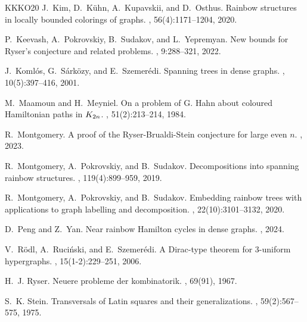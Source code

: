 \documentclass[11pt,reqno]{amsart}
\theoremstyle{definition}
\theoremstyle{remark}
\begin{document}
\begin{thebibliography}{KKKO20}
J.~Kim, D.~K{\"u}hn, A.~Kupavskii, and D.~Osthus.
\newblock Rainbow structures in locally bounded colorings of graphs.
, 56(4):1171--1204, 2020.

P.~Keevash, A.~Pokrovskiy, B.~Sudakov, and L.~Yepremyan.
\newblock New bounds for {R}yser's conjecture and related problems.
, 9:288--321, 2022.

J.~Koml\'{o}s, G.~S\'{a}rk\"{o}zy, and E.~Szemer\'{e}di.
\newblock Spanning trees in dense graphs.
, 10(5):397--416, 2001.

M.~Maamoun and H.~Meyniel.
\newblock On a problem of {G}. {H}ahn about coloured {H}amiltonian paths in {$K\sb{2n}$}.
, 51(2):213--214, 1984.

R.~Montgomery.
\newblock A proof of the {R}yser-{B}rualdi-{S}tein conjecture for large even $ n$.
, 2023.

R.~Montgomery, A.~Pokrovskiy, and B.~Sudakov.
\newblock Decompositions into spanning rainbow structures.
, 119(4):899--959, 2019.

R.~Montgomery, A.~Pokrovskiy, and B.~Sudakov.
\newblock Embedding rainbow trees with applications to graph labelling and decomposition.
, 22(10):3101--3132, 2020.

D.~Peng and Z.~Yan.
\newblock Near rainbow {H}amilton cycles in dense graphs.
, 2024.

V.~R\"{o}dl, A.~Ruci\'{n}ski, and E.~Szemer\'{e}di.
\newblock A {D}irac-type theorem for 3-uniform hypergraphs.
, 15(1-2):229--251, 2006.

H.~J. Ryser.
\newblock Neuere probleme der kombinatorik.
, 69(91), 1967.

S.~K. Stein.
\newblock Transversals of {L}atin squares and their generalizations.
, 59(2):567--575, 1975.

\end{thebibliography}
\end{document}
